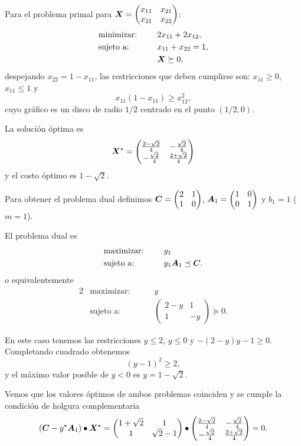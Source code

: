 \begin{example}
Para el problema primal para $\bm{X} = \begin{pmatrix} x_{11} & x_{21} \\ x_{21} & x_{22} \end{pmatrix}$:
\begin{alignat*}{2}
  & \text{minimizar: }  & \quad & 2x_{11} + 2x_{12},   \\
   & \text{sujeto a: } & \quad & x_{11} + x_{22} = 1, \\
   & & &  \bm{X} \succeq 0,
\end{alignat*}
despejando $x_{22} = 1 - x_{11}$, las restricciones que deben cumplirse son: $x_{11} \ge 0$, $x_{11} \le 1$ y 
$$
x_{11}(1-x_{11}) \ge x_{12}^2,
$$
cuyo gráfico es un disco de radio $1/2$ centrado en el punto $(1/2, 0)$.

La solución óptima es 
$$
\bm{X}^\star = \begin{pmatrix}
\frac{2 - \sqrt{2}}{4} & -\frac{\sqrt{2}}{4} \\
-\frac{\sqrt{2}}{4} & \frac{2 + \sqrt{2}}{4} 
\end{pmatrix}
$$
y el costo óptimo es $1 - \sqrt{2}$.

Para obtener el problema dual definimos $\bm{C} = \begin{pmatrix}
2 & 1 \\ 1 & 0
\end{pmatrix}$, $\bm{A}_1 = \begin{pmatrix}
1 & 0 \\ 0 & 1
\end{pmatrix}$ y $b_1 = 1$ ($m = 1$).

El problema dual es
\begin{alignat*}{2}
  & \text{maximizar: }  & \quad & y_1   \\
   & \text{sujeto a: } & \quad & y_1 \bm{A}_1 \preceq \bm{C}.
\end{alignat*}
o equivalentemente
\begin{alignat*}{2}
  & \text{maximizar: }  & \quad & y   \\
   & \text{sujeto a: } & \quad & \begin{pmatrix}
2 - y & 1 \\ 1 & -y \end{pmatrix} \succeq 0.
\end{alignat*}

En este caso tenemos las restricciones $y \le 2$, $y \le 0$ y $-(2-y)y - 1 \ge 0$. Completando cuadrado obtenemos
$$
(y-1)^2 \ge 2,
$$
y el máximo valor posible de $y < 0$ es $y = 1 - \sqrt{2}$.

Vemos que los valores óptimos de ambos problemas coinciden y se cumple la condición de holgura complementaria
$$
(\bm{C} - y^\star \bm{A}_1 ) \bullet \bm{X}^\star = 
\begin{pmatrix}
1 + \sqrt{2} & 1 \\ 1 & \sqrt{2} - 1 
\end{pmatrix} \bullet \begin{pmatrix}
\frac{2 - \sqrt{2}}{4} & -\frac{\sqrt{2}}{4} \\
-\frac{\sqrt{2}}{4} & \frac{2 + \sqrt{2}}{4}
\end{pmatrix} = 0.
$$
\end{example}

